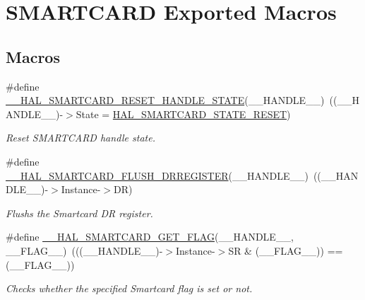 \hypertarget{group___s_m_a_r_t_c_a_r_d___exported___macros}{}\section{S\+M\+A\+R\+T\+C\+A\+RD Exported Macros}
\label{group___s_m_a_r_t_c_a_r_d___exported___macros}
\subsection*{Macros}
\begin{DoxyCompactItemize}
\item 
\#define \hyperlink{group___s_m_a_r_t_c_a_r_d___exported___macros_ga080b197f190ae36b8db1745a4db94bf4}{\+\_\+\+\_\+\+H\+A\+L\+\_\+\+S\+M\+A\+R\+T\+C\+A\+R\+D\+\_\+\+R\+E\+S\+E\+T\+\_\+\+H\+A\+N\+D\+L\+E\+\_\+\+S\+T\+A\+TE}(\+\_\+\+\_\+\+H\+A\+N\+D\+L\+E\+\_\+\+\_\+)~((\+\_\+\+\_\+\+H\+A\+N\+D\+L\+E\+\_\+\+\_\+)-\/$>$State = \hyperlink{group___s_m_a_r_t_c_a_r_d___exported___types_gga79d6a3b95636861dcfd70913746e087ea3bb178c89408959b462cf8bc607034cb}{H\+A\+L\+\_\+\+S\+M\+A\+R\+T\+C\+A\+R\+D\+\_\+\+S\+T\+A\+T\+E\+\_\+\+R\+E\+S\+ET})
\begin{DoxyCompactList}\small\item\em Reset S\+M\+A\+R\+T\+C\+A\+RD handle state. \end{DoxyCompactList}\item 
\#define \hyperlink{group___s_m_a_r_t_c_a_r_d___exported___macros_ga942e652bb57d4f12e7273f4e97035ff4}{\+\_\+\+\_\+\+H\+A\+L\+\_\+\+S\+M\+A\+R\+T\+C\+A\+R\+D\+\_\+\+F\+L\+U\+S\+H\+\_\+\+D\+R\+R\+E\+G\+I\+S\+T\+ER}(\+\_\+\+\_\+\+H\+A\+N\+D\+L\+E\+\_\+\+\_\+)~((\+\_\+\+\_\+\+H\+A\+N\+D\+L\+E\+\_\+\+\_\+)-\/$>$Instance-\/$>$DR)
\begin{DoxyCompactList}\small\item\em Flushs the Smartcard DR register. \end{DoxyCompactList}\item 
\#define \hyperlink{group___s_m_a_r_t_c_a_r_d___exported___macros_ga38f995afc135ddbaafc0c68e12c31f11}{\+\_\+\+\_\+\+H\+A\+L\+\_\+\+S\+M\+A\+R\+T\+C\+A\+R\+D\+\_\+\+G\+E\+T\+\_\+\+F\+L\+AG}(\+\_\+\+\_\+\+H\+A\+N\+D\+L\+E\+\_\+\+\_\+,  \+\_\+\+\_\+\+F\+L\+A\+G\+\_\+\+\_\+)~(((\+\_\+\+\_\+\+H\+A\+N\+D\+L\+E\+\_\+\+\_\+)-\/$>$Instance-\/$>$SR \& (\+\_\+\+\_\+\+F\+L\+A\+G\+\_\+\+\_\+)) == (\+\_\+\+\_\+\+F\+L\+A\+G\+\_\+\+\_\+))
\begin{DoxyCompactList}\small\item\em Checks whether the specified Smartcard flag is set or not. \end{DoxyCompactList}\item 

\end{DoxyCompactItemize}
